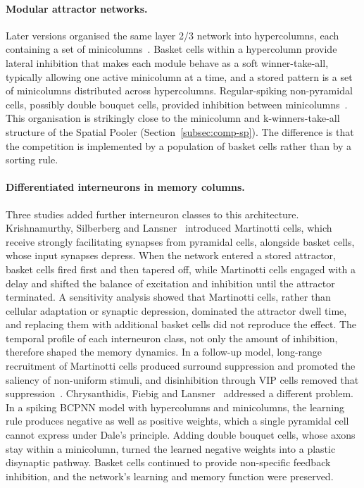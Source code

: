 \paragraph{Modular attractor networks.}
Later versions organised the same layer 2/3 network into hypercolumns, each
containing a set of minicolumns~\cite{lundqvist2006attractor}. Basket cells within
a hypercolumn provide lateral inhibition that makes each module behave as a soft
winner-take-all, typically allowing one active minicolumn at a time, and a
stored pattern is a set of minicolumns distributed across hypercolumns.
Regular-spiking non-pyramidal cells, possibly double bouquet cells, provided
inhibition between minicolumns~\cite{krishnamurthy2012cortical}. This
organisation is strikingly close to the minicolumn and k-winners-take-all
structure of the Spatial Pooler (Section~\ref{subsec:comp-sp}). The difference
is that the competition is implemented by a population of basket cells rather
than by a sorting rule.

\paragraph{Differentiated interneurons in memory columns.}
Three studies added further interneuron classes to this architecture.
Krishnamurthy, Silberberg and Lansner~\cite{krishnamurthy2012cortical} introduced
Martinotti cells, which receive strongly facilitating synapses from pyramidal
cells, alongside basket cells, whose input synapses depress. When the network
entered a stored attractor, basket cells fired first and then tapered off, while
Martinotti cells engaged with a delay and shifted the balance of excitation and
inhibition until the attractor terminated. A sensitivity analysis showed
that Martinotti cells, rather than cellular adaptation or synaptic depression,
dominated the attractor dwell time, and replacing them with additional basket
cells did not reproduce the effect. The temporal profile of each interneuron
class, not only the amount of inhibition, therefore shaped the memory dynamics.
In a follow-up model, long-range recruitment of Martinotti cells produced
surround suppression and promoted the saliency of non-uniform stimuli, and
disinhibition through VIP cells removed that suppression~\cite{krishnamurthy2015longrange}.
Chrysanthidis, Fiebig and Lansner~\cite{chrysanthidis2019introducing} addressed a
different problem. In a spiking BCPNN model with hypercolumns and minicolumns,
the learning rule produces negative as well as positive weights, which a single
pyramidal cell cannot express under Dale's principle. Adding double bouquet
cells, whose axons stay within a minicolumn, turned the learned negative weights
into a plastic disynaptic pathway. Basket cells continued to provide
non-specific feedback inhibition, and the network's learning and memory
function were preserved.


